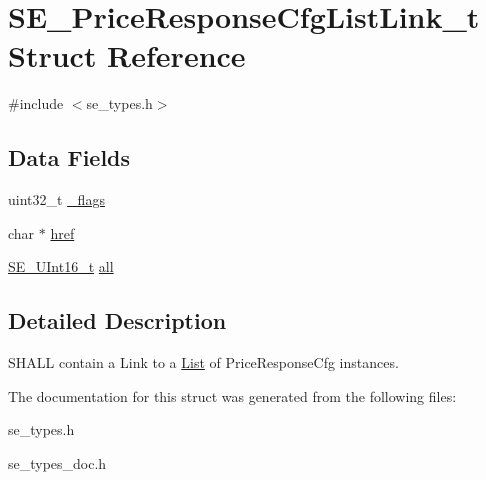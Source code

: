 \hypertarget{structSE__PriceResponseCfgListLink__t}{}\section{S\+E\+\_\+\+Price\+Response\+Cfg\+List\+Link\+\_\+t Struct Reference}
\label{structSE__PriceResponseCfgListLink__t}


{\ttfamily \#include $<$se\+\_\+types.\+h$>$}

\subsection*{Data Fields}
\begin{DoxyCompactItemize}
\item 
uint32\+\_\+t \hyperlink{group__PriceResponseCfgListLink_gabc4cbe7ac6f6ff978fe6bf45dfd3efcd}{\+\_\+flags}
\item 
char $\ast$ \hyperlink{group__PriceResponseCfgListLink_ga251e7e1e13f7186865ef9cee46ae1ca8}{href}
\item 
\hyperlink{group__UInt16_gac68d541f189538bfd30cfaa712d20d29}{S\+E\+\_\+\+U\+Int16\+\_\+t} \hyperlink{group__PriceResponseCfgListLink_gadf74318e90daf92ff98a6f3a3d2e2c2b}{all}
\end{DoxyCompactItemize}


\subsection{Detailed Description}
S\+H\+A\+LL contain a Link to a \hyperlink{structList}{List} of Price\+Response\+Cfg instances. 

The documentation for this struct was generated from the following files\+:\begin{DoxyCompactItemize}
\item 
se\+\_\+types.\+h\item 
se\+\_\+types\+\_\+doc.\+h\end{DoxyCompactItemize}
